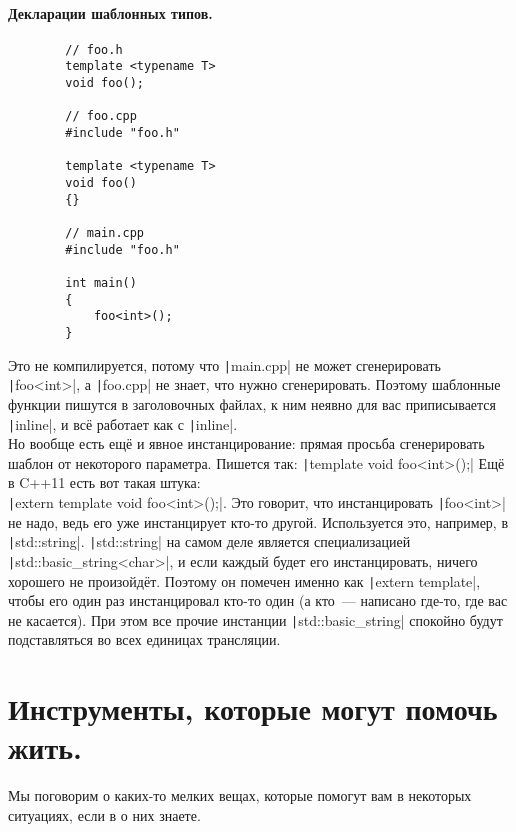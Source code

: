 \documentclass{article}
\begin{document}
    \paragraph{Декларации шаблонных типов.}
    \begin{verbatim}
        // foo.h
        template <typename T>
        void foo();

        // foo.cpp
        #include "foo.h"

        template <typename T>
        void foo()
        {}

        // main.cpp
        #include "foo.h"

        int main()
        {
            foo<int>();
        }
    \end{verbatim}
    Это не компилируется, потому что \texttt|main.cpp| не может сгенерировать \texttt|foo<int>|, а \texttt|foo.cpp| не знает, что нужно сгенерировать. Поэтому шаблонные функции пишутся в заголовочных файлах, к ним неявно для вас приписывается \texttt|inline|, и всё работает как с \texttt|inline|.\\
    Но вообще есть ещё и явное инстанцирование: прямая просьба сгенерировать шаблон от некоторого параметра. Пишется так: \texttt|template void foo<int>();| Ещё в C++11 есть вот такая штука:\\\texttt|extern template void foo<int>();|. Это говорит, что инстанцировать \texttt|foo<int>| не надо, ведь его уже инстанцирует кто-то другой. Используется это, например, в \texttt|std::string|. \texttt|std::string| на самом деле является специализацией \texttt|std::basic_string<char>|, и если каждый будет его инстанцировать, ничего хорошего не произойдёт. Поэтому он помечен именно как \texttt|extern template|, чтобы его один раз инстанцировал кто-то один (а кто~--- написано где-то, где вас не касается). При этом все прочие инстанции \texttt|std::basic_string| спокойно будут подставляться во всех единицах трансляции.
    \section{Инструменты, которые могут помочь жить.}
    Мы поговорим о каких-то мелких вещах, которые помогут вам в некоторых ситуациях, если в о них знаете.
\end{document}
